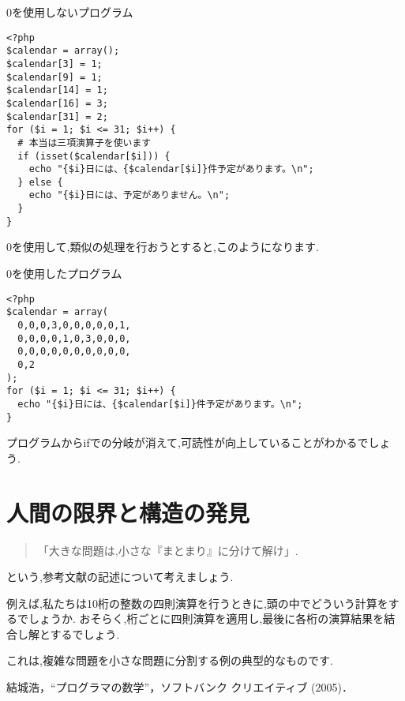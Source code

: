 \documentclass[10pt, twocolumn]{jarticle}
\begin{document}
\begin{itembox}[l]{0を使用しないプログラム}
\begin{verbatim}
<?php
$calendar = array();
$calendar[3] = 1;
$calendar[9] = 1;
$calendar[14] = 1;
$calendar[16] = 3;
$calendar[31] = 2;
for ($i = 1; $i <= 31; $i++) {
  # 本当は三項演算子を使います
  if (isset($calendar[$i])) {
    echo "{$i}日には、{$calendar[$i]}件予定があります。\n";
  } else {
    echo "{$i}日には、予定がありません。\n";
  }
}
\end{verbatim}
\end{itembox}

0を使用して,類似の処理を行おうとすると,このようになります.

\begin{itembox}[l]{0を使用したプログラム}
\begin{verbatim}
<?php
$calendar = array(
  0,0,0,3,0,0,0,0,0,1,
  0,0,0,0,1,0,3,0,0,0,
  0,0,0,0,0,0,0,0,0,0,
  0,2
);
for ($i = 1; $i <= 31; $i++) {
  echo "{$i}日には、{$calendar[$i]}件予定があります。\n";
}
\end{verbatim}
\end{itembox}

プログラムからifでの分岐が消えて,可読性が向上していることがわかるでしょう.

\section{人間の限界と構造の発見}

\begin{quote}
「大きな問題は,小さな『まとまり』に分けて解け」.
\end{quote}
という,参考文献の記述について考えましょう.

例えば,私たちは10桁の整数の四則演算を行うときに,頭の中でどういう計算をするでしょうか.
おそらく,桁ごとに四則演算を適用し,最後に各桁の演算結果を結合し解とするでしょう.

これは,複雑な問題を小さな問題に分割する例の典型的なものです.

\begin{thebibliography}{9}
     結城浩，“プログラマの数学”，ソフトバンク クリエイティブ (2005)．
\end{thebibliography}
\end{document}
